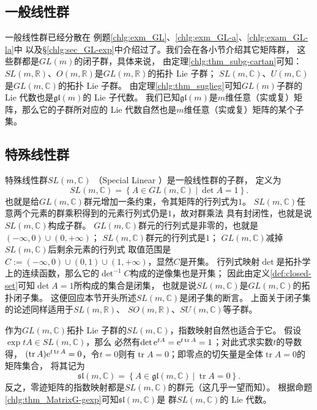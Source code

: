 \subsection{一般线性群}
一般线性群已经分散在
例题\ref{chlg:exm_GL}、\ref{chlg:exm_GL-a}、\ref{chlg:exam_GL-la}中
以及\S\ref{chlg:sec_GL-exp}中介绍过了。我们会在各小节介绍其它矩阵群，
这些群都是$GL(m)$的闭子群，具体来说，
由定理\ref{chlg:thm_subg-cartan}可知：
$SL(m,\mathbb{R})$、$O(m,\mathbb{R})$是$GL(m,\mathbb{R})$的拓扑 Lie 子群；
$SL(m,\mathbb{C})$、$U(m,\mathbb{C})$是$GL(m,\mathbb{C})$的拓扑 Lie 子群。
由定理\ref{chlg:thm_suglieg}可知$GL(m)$子群的 Lie 代数也是$\mathfrak{gl}(m)$的 Lie 子代数。
我们已知$\mathfrak{gl}(m)$是$m$维任意（实或复）矩阵，那么它的子群所对应的
 Lie 代数自然也是$m$维任意（实或复）矩阵的某个子集。

\subsection{特殊线性群}
特殊线性群$SL(m,\mathbb{C})$ （Special Linear ）是一般线性群的子群，
定义为
\begin{equation}
    SL(m,\mathbb{C}) = \left\{ A \in GL(m,\mathbb{C})\ |\ \det A =1 \right\} .
\end{equation}
也就是给$GL(m,\mathbb{C})$群元增加一条约束，令其矩阵的行列式为$1$。
$SL(m,\mathbb{C})$任意两个元素的群乘积得到的元素行列式仍是$1$，故对群乘法
具有封闭性，也就是说$SL(m,\mathbb{C})$构成子群。
$GL(m,\mathbb{C})$群元的行列式是非零的，也就是$(-\infty,0)\cup (0,+\infty)$；
$SL(m,\mathbb{C})$群元的行列式是$1$；
$GL(m,\mathbb{C})$减掉$SL(m,\mathbb{C})$后剩余元素的行列式
取值范围是$C := (-\infty,0)\cup (0,1)\cup (1,+\infty)$，显然$C$是开集。
行列式映射$\det$是拓扑学上的连续函数，那么它的$\det^{-1}C$构成的逆像集也是开集；
因此由定义\ref{def:closed-set}可知$\det A =1$所构成的集合是{闭集}，
也就是说$SL(m,\mathbb{C})$是$GL(m,\mathbb{C})$的拓扑闭子集。
这便回应本节开头所述$SL(m,\mathbb{C})$是闭子集的断言。
上面关于闭子集的论述同样适用于$SL(m,\mathbb{R})$、
$SO(m,\mathbb{R})$、$SU(m,\mathbb{C})$等子群。

作为$GL(m,\mathbb{C})$拓扑 Lie 子群的$SL(m,\mathbb{C})$，指数映射自然也适合于它。
假设$\exp tA \in SL(m,\mathbb{C})$，那么
必然有$\det \mathrm{e}^{tA} =\mathrm{e}^{t \operatorname{tr}A} =1$；对此式求实数$t$的导数得，
$(\operatorname{tr}A) \mathrm{e}^{t \operatorname{tr}A} =0$，令$t=0$则有$\operatorname{tr}A=0$；即零点的切矢量是全体$\operatorname{tr}A=0$的矩阵集合，
将其记为
\begin{equation}
    \mathfrak{sl}(m,\mathbb{C})= \left\{A\in\mathfrak{gl}(m,\mathbb{C})\ |\ \operatorname{tr} A =0 \right\} .
\end{equation}
反之，零迹矩阵的指数映射都是$SL(m,\mathbb{C})$的群元（这几乎一望而知）。
根据命题\ref{chlg:thm_MatrixG-gexp}可知$\mathfrak{sl}(m,\mathbb{C})$是
群$SL(m,\mathbb{C})$的 Lie 代数。

